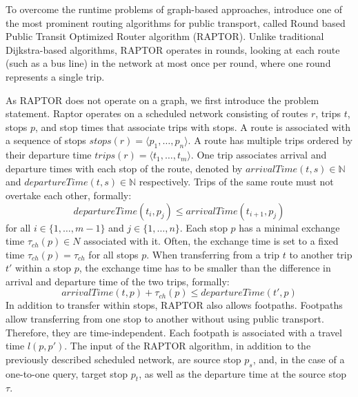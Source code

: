 To overcome the runtime problems of graph-based approaches,  introduce one of the most prominent routing algorithms for public transport, called Round based Public Transit Optimized Router algorithm (RAPTOR). %
Unlike traditional Dijkstra-based algorithms, RAPTOR operates in rounds, looking at each route (such as a bus line) in the network at most once per round, where one round represents a single trip.

As RAPTOR does not operate on a graph, we first introduce the problem statement.
Raptor operates on a scheduled network consisting of routes \(r\), trips \(t\), stops \(p\), and stop times that associate trips with stops.
A route is associated with a sequence of stops \(stops(r) = \langle p_1, \dots, p_n \rangle\).
A route has multiple trips ordered by their departure time \(trips(r) = \langle t_1, \dots, t_m \rangle\).
One trip associates arrival and departure times with each stop of the route, denoted by \(arrivalTime(t, s) \in \mathbb{N}\) and \(departureTime(t, s) \in \mathbb{N}\) respectively.
Trips of the same route must not overtake each other, formally:
\[departureTime(t_i, p_j) \leq arrivalTime(t_{i+1}, p_j)\]
for all \(i \in \{1, \dots, m-1\}\) and \(j \in \{1, \dots, n\}\).
Each stop \(p\) has a minimal exchange time \(\tau_{ch}(p) \in N\) associated with it.
Often, the exchange time is set to a fixed time \(\tau_{ch}(p) = \tau_{ch}\) for all stops \(p\).
When transferring from a trip \(t\) to another trip \(t' \) within a stop \(p\), the exchange time has to be smaller than the difference in arrival and departure time of the two trips, formally:
\[arrivalTime(t, p) + \tau_{ch}(p) \leq departureTime(t', p) \]
In addition to transfer within stops, RAPTOR also allows footpaths.
Footpaths allow transferring from one stop to another without using public transport. Therefore, they are time-independent.
Each footpath is associated with a travel time \(l(p, p')\).
The input of the RAPTOR algorithm, in addition to the previously described scheduled network, are source stop \(p_s\), and, in the case of a one-to-one query, target stop \(p_t\), as well as the departure time at the source stop \(\tau\).

